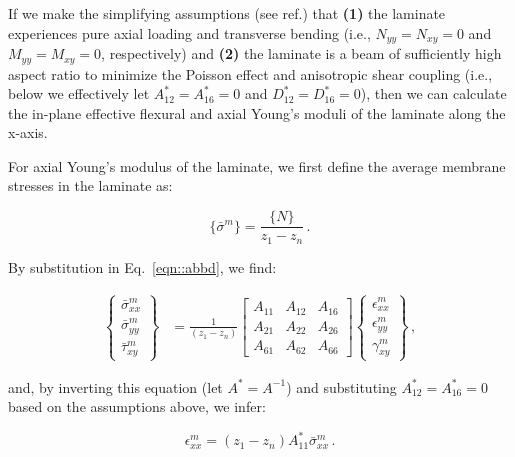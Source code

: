 \documentclass[twocolumn, linenumbers, superscriptaddress, nofootinbib]{revtex4-1}
\begin{document}
				If we make the simplifying assumptions (see ref.) that \textbf{(1)} the laminate experiences pure axial loading and transverse bending (i.e., $N_{yy} = N_{xy} = 0$ and $M_{yy} = M_{xy} = 0$, respectively) and \textbf{(2)} the laminate is a beam of sufficiently high aspect ratio to minimize the Poisson effect and anisotropic shear coupling (i.e., below we effectively let $A^*_{12} = A^*_{16} = 0$ and $D^*_{12} = D^*_{16} = 0$), then we can calculate the in-plane effective flexural and axial Young's moduli of the laminate along the x-axis.
				
				For axial Young's modulus of the laminate, we first define the average membrane stresses in the laminate as:
				
				\begin{equation}
					\{\bar{\sigma}^m\} = \frac{\{N\}}{z_1 - z_n}\,.
				\end{equation}
				
				By substitution in Eq.~\ref{eqn::abbd}, we find:
				
				\begin{equation}
					\begin{aligned}
						\begin{Bmatrix}
							\bar{\sigma}^m_{xx} \\
							\bar{\sigma}^m_{yy} \\
							\bar{\tau}^m_{xy}
						\end{Bmatrix}
						& = \frac{1}{(z_1 - z_n)}
						\begin{bmatrix}
							A_{11} & A_{12} & A_{16} \\
							A_{21} & A_{22} & A_{26} \\
							A_{61} & A_{62} & A_{66}
						\end{bmatrix}
						\begin{Bmatrix}
							\epsilon^m_{xx} \\
							\epsilon^m_{yy} \\
							\gamma^m_{xy}
						\end{Bmatrix}\,,
					\end{aligned}
				\end{equation}
				
				and, by inverting this equation (let $A^* = A^{-1}$) and substituting $A^*_{12} = A^*_{16} = 0$ based on the assumptions above, we infer:
				
				\begin{equation}
					\epsilon^m_{xx} = (z_1 - z_n)A^{*}_{11}\bar{\sigma}^m_{xx}\,.
				\end{equation}
				
\end{document}
